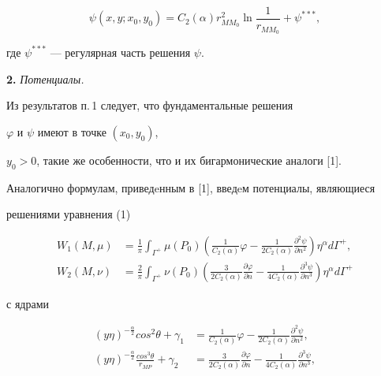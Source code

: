 $$


\psi(x,y;x_{0},y_{0})=C_{2}(\alpha)r_{MM_{0}}^{2}\ln\frac{1}{r_{MM_{0}}}+


\psi^{***},


$$


где $\psi^{***}$ --- регулярная часть решения $\psi$.





{\bf 2.} {\it Потенциалы.}


Из результатов п.\,1 следует, что фундаментальные решения


$\varphi$ и $\psi$ имеют в точке $(x_{0},y_{0})$,


$y_{0}>0$, такие же особенности, что и их бигармонические аналоги [1].


Аналогично формулам, приведeнным в [1], введeм потенциалы, являющиеся 


решениями уравнения (1)


\begin{align*}


W_{1}(M,\mu)&=\frac{1}{\pi}\int_{\Gamma^{+}}\mu(P_{0})\left(\frac{1}


{C_{2}(\alpha)}\varphi-\frac{1}{2C_{2}(\alpha)}\frac{\partial^{2} \psi}


{\partial n^{2}}\right)\eta^{\alpha}d \Gamma^{+},\\


%


W_{2}(M,\nu)&=\frac{2}{\pi}\int_{\Gamma^{+}}\nu(P_{0})\left(\frac{3}


{2C_{2}(\alpha)}\frac{\partial \varphi}{\partial n}-\frac{1}{4C_{2}(\alpha)}


\frac{\partial^{3}\psi}{\partial n^{3}}\right)\eta^{\alpha}d 


\Gamma^{+}


\end{align*}


с ядрами


\begin{align*}


(y\eta)^{-\frac{\alpha}{2}}cos^{2}\theta+\gamma_{1}&=\frac{1}


{C_{2}(\alpha)}\varphi-\frac{1}{2C_{2}(\alpha)}\frac{\partial^{2} \psi}


{\partial n^{2}}, \\


%


(y\eta)^{-\frac{\alpha}{2}}\frac{cos^{3}\theta}{r_{MP}}+\gamma_{2}&=\frac{3}


{2C_{2}(\alpha)}\frac{\partial \varphi}{\partial n}-\frac{1}{4C_{2}(\alpha)}


\frac{\partial^{3}\psi}{\partial n^{3}},


\end{align*}


